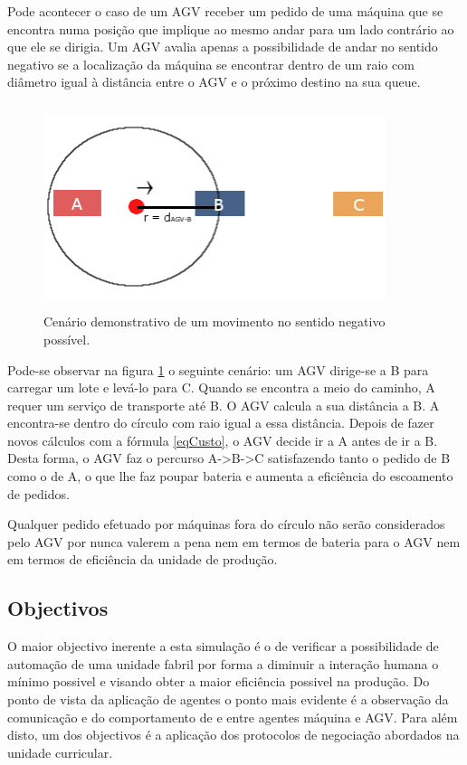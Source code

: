 \begin{titlepage}
Pode acontecer o caso de um AGV receber um pedido de uma máquina que se encontra numa posição que implique ao mesmo andar para um lado contrário ao que ele se dirigia. Um AGV avalia apenas a possibilidade de andar no sentido negativo se a localização da máquina se encontrar dentro de um raio com diâmetro igual à distância entre o AGV e o próximo destino na sua queue.\newline

\begin{figure}[H]
  \centering
    \includegraphics[width=10cm, height = 6cm]{negativeMotion.png}
  \caption{Cenário demonstrativo de um movimento no sentido negativo possível.}
  \label{negativeMotion}
\end{figure}

Pode-se observar na figura \ref{negativeMotion} o seguinte cenário: um AGV dirige-se a B para carregar um lote e levá-lo para C. Quando se encontra a meio do caminho, A requer um serviço de transporte até B. O AGV calcula a sua distância a B. A encontra-se dentro do círculo com raio igual a essa distância. Depois de fazer novos cálculos com a fórmula \ref{eqCusto}, o AGV decide ir a A antes de ir a B. Desta forma, o AGV faz o percurso A->B->C satisfazendo tanto o pedido de B como o de A, o que lhe faz poupar bateria e aumenta a eficiência do escoamento de pedidos.\newline

Qualquer pedido efetuado por máquinas fora do círculo não serão considerados pelo AGV por nunca valerem a pena nem em termos de bateria para o AGV nem em termos de eficiência da unidade de produção.

\subsection{Objectivos}
\justify\normalsize
O maior objectivo inerente a esta simulação é o de verificar a possibilidade de automação de uma unidade fabril por forma a diminuir a interação humana o mínimo possivel e visando obter a maior eficiência possivel na produção. Do ponto de vista da aplicação de agentes o ponto mais evidente é a observação da comunicação e do comportamento de e entre agentes máquina e AGV. Para além disto, um dos objectivos é a aplicação dos protocolos de negociação abordados na unidade curricular.


\end{titlepage}
